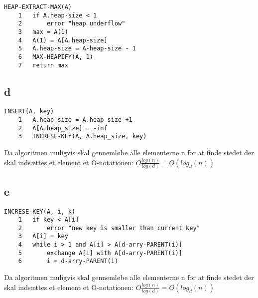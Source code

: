 \documentclass{article}
\begin{document}
    \begin{verbatim}
HEAP-EXTRACT-MAX(A)
    1   if A.heap-size < 1
    2       error "heap underflow"
    3   max = A(1)
    4   A(1) = A[A.heap-size]
    5   A.heap-size = A-heap-size - 1
    6   MAX-HEAPIFY(A, 1)
    7   return max
    \end{verbatim}
\subsection{d}

    \begin{verbatim}
INSERT(A, key)
    1   A.heap_size = A.heap_size +1
    2   A[A.heap_size] = -inf
    3   INCRESE-KEY(A, A.heap_size, key)
    \end{verbatim}
    
    Da algoritmen muligvis skal gennemløbe alle elementerne n for at finde stedet der skal indsættes et element et O-notationen:
    $ O \frac{log(n)}{log(d)} = O(log_d(n)) $
\subsection{e}

    \begin{verbatim}
INCRESE-KEY(A, i, k)
    1   if key < A[i]
    2       error "new key is smaller than current key"
    3   A[i] = key
    4   while i > 1 and A[i] > A[d-arry-PARENT(i)]
    5       exchange A[i] with A[d-arry-PARENT(i)]
    6       i = d-arry-PARENT(i)
    \end{verbatim}
    Da algoritmen muligvis skal gennemløbe alle elementerne n for at finde stedet der skal indsættes et element et O-notationen:
    $ O \frac{log(n)}{log(d)} = O(log_d(n)) $
\end{document}

